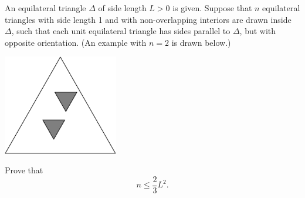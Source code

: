 An equilateral triangle $\Delta$ of side length $L>0$ is given. Suppose that $n$ equilateral triangles with side length 1 and with non-overlapping interiors are drawn inside $\Delta$, such that each unit equilateral triangle has sides parallel to $\Delta$, but with opposite orientation. (An example with $n=2$ is drawn below.)
\begin{center}
\includegraphics[width = 50.400000000000006mm]{img/fig0.png}
\end{center}
Prove that \[n \leq \frac{2}{3} L^{2}.\]